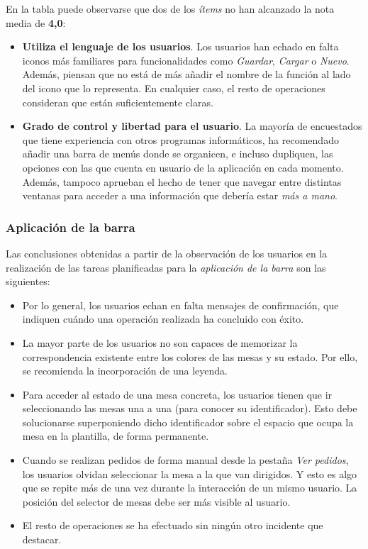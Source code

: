 En la tabla puede observarse que dos de los \emph{ítems} no han alcanzado la
nota media de \textbf{4,0}:
\begin{itemize}
\item \textbf{Utiliza el lenguaje de los usuarios}. Los usuarios han echado
en falta iconos más familiares para funcionalidades como \emph{Guardar},
\emph{Cargar} o \emph{Nuevo}. Además, piensan que no está de más añadir el
nombre de la función al lado del icono que lo representa. En cualquier caso,
el resto de operaciones consideran que están suficientemente claras.
\item \textbf{Grado de control y libertad para el usuario}. La mayoría de
encuestados que tiene experiencia con otros programas informáticos, ha
recomendado añadir una barra de menús donde se organicen, e incluso dupliquen,
las opciones con las que cuenta en usuario de la aplicación en cada momento.
Además, tampoco aprueban el hecho de tener que navegar entre distintas ventanas
para acceder a una información que debería estar \emph{más a mano}.
\end{itemize}

\subsubsection{Aplicación de la barra}
Las conclusiones obtenidas a partir de la observación de los usuarios en la
realización de las tareas planificadas para la \emph{aplicación de la barra}
son las siguientes:
\begin{itemize}
\item Por lo general, los usuarios echan en falta mensajes de confirmación,
que indiquen cuándo una operación realizada ha concluido con éxito.
\item La mayor parte de los usuarios no son capaces de memorizar la
correspondencia existente entre los colores de las mesas y su estado. Por ello,
se recomienda la incorporación de una leyenda.
\item Para acceder al estado de una mesa concreta, los usuarios tienen que
ir seleccionando las mesas una a una (para conocer su identificador). Esto
debe solucionarse superponiendo dicho identificador sobre el espacio que ocupa
la mesa en la plantilla, de forma permanente.
\item Cuando se realizan pedidos de forma manual desde la pestaña \emph{Ver
pedidos}, los usuarios olvidan seleccionar la mesa a la que van dirigidos. Y
esto es algo que se repite más de una vez durante la interacción de un mismo
usuario. La posición del selector de mesas debe ser más visible al usuario.
\item El resto de operaciones se ha efectuado sin ningún otro
incidente que destacar.
\end{itemize}

